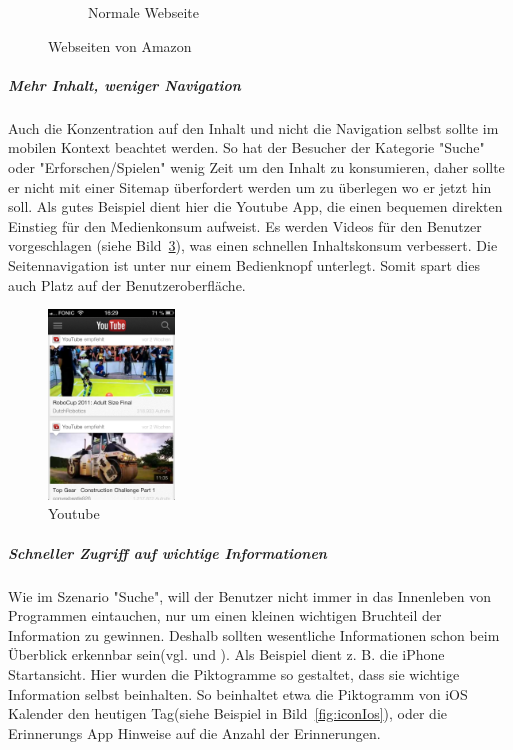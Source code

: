 \begin{figure}
\begin{subfigure}[b]{0.6\textwidth}
		\caption{Normale Webseite}\label{fig:amazonFull}
	\end{subfigure}
	\caption{Webseiten von Amazon}\label{fig:amazonSites}
\end{figure}

\subparagraph{Mehr Inhalt, weniger Navigation} 
\label{subp:entferne_das_fett} 

Auch die Konzentration auf den Inhalt und nicht die Navigation selbst sollte im mobilen Kontext beachtet werden\cite[Seite 52]{mobileFirst}. So hat der Besucher der Kategorie "Suche" oder "Erforschen/Spielen"  wenig Zeit um den Inhalt zu konsumieren, daher sollte er nicht mit einer Sitemap überfordert werden um zu überlegen wo er jetzt hin soll. Als gutes Beispiel dient hier die Youtube App, die einen bequemen direkten Einstieg für den Medienkonsum aufweist. Es werden Videos für den Benutzer vorgeschlagen (siehe Bild~\ref{fig:youtube}), was einen schnellen Inhaltskonsum verbessert. Die Seitennavigation ist unter nur einem Bedienknopf unterlegt. Somit spart dies auch Platz auf der Benutzeroberfläche.

\begin{figure}
	\begin{center}
	\includegraphics[width=0.3\textwidth]{img/youtube.png}
	\caption{Youtube}\label{fig:youtube}
\end{center}
\end{figure}

\subparagraph{Schneller Zugriff auf wichtige Informationen} 
\label{subp:subparagraph_name}

Wie im Szenario "Suche", will der Benutzer nicht immer in das Innenleben von Programmen eintauchen, nur um einen kleinen wichtigen Bruchteil der Information zu gewinnen. Deshalb sollten wesentliche Informationen schon beim Überblick erkennbar sein(vgl. \cite[Seite 54]{mobileFrontier} und \cite{Neil:2012uf}). Als Beispiel dient z. B. die iPhone Startansicht. Hier wurden die Piktogramme so gestaltet, dass sie wichtige Information selbst beinhalten. So beinhaltet etwa die Piktogramm von iOS Kalender den heutigen Tag(siehe Beispiel in Bild~\ref{fig:iconIos}), oder die Erinnerungs App Hinweise auf die Anzahl der Erinnerungen.

